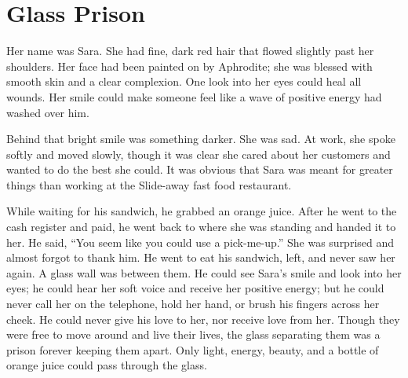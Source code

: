 \chapter{Glass Prison}

Her name was Sara. She had fine, dark red hair that flowed slightly past her shoulders. Her face had been painted on by Aphrodite; she was blessed with smooth skin and a clear complexion. One look into her eyes could heal all wounds. Her smile could make someone feel like a wave of positive energy had washed over him.

Behind that bright smile was something darker. She was sad. At work, she spoke softly and moved slowly, though it was clear she cared about her customers and wanted to do the best she could. It was obvious that Sara was meant for greater things than working at the Slide-away fast food restaurant.

While waiting for his sandwich, he grabbed an orange juice. After he went to the cash register and paid, he went back to where she was standing and handed it to her. He said, “You seem like you could use a pick-me-up.” She was surprised and almost forgot to thank him. He went to eat his sandwich, left, and never saw her again. A glass wall was between them. He could see Sara's smile and look into her eyes; he could hear her soft voice and receive her positive energy; but he could never call her on the telephone, hold her hand, or brush his fingers across her cheek. He could never give his love to her, nor receive love from her. Though they were free to move around and live their lives, the glass separating them was a prison forever keeping them apart. Only light, energy, beauty, and a bottle of orange juice could pass through the glass.